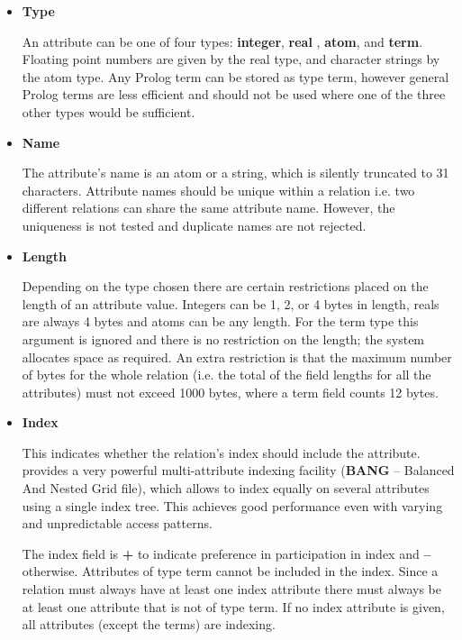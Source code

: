 \begin{itemize}

\item{{\bf Type}}

An attribute can be one of four types:
{\bf integer}, {\bf real} , {\bf atom}, and {\bf term}.  Floating point numbers
are given by the real type, and character strings by the atom type. Any Prolog
term can be stored as type term, however general Prolog terms are
less efficient and should not be used where one of the three other types
would be sufficient.

\item{{\bf Name}}
 
The attribute's name is an atom or a string, which is silently
truncated to 31 characters. Attribute names should be unique within
a relation i.e. two different relations can share the same
attribute name. However, the uniqueness is not tested and duplicate names
are not rejected.

\item{{\bf Length}}
 
Depending on the type chosen there are certain
restrictions placed on the length of an attribute value.
Integers can be 1, 2, or 4 bytes in length, reals are always 4 bytes and atoms
can be any length.  For the term type this argument is ignored and there
is no restriction on the length; the
system allocates space as required.  An extra restriction is that the maximum number
of bytes for the whole relation (i.e. the total of the field lengths
for all the attributes) must not exceed 1000 bytes, where a term field counts
12 bytes.

\item{{\bf Index}}

 
This indicates whether the relation's index should include the attribute.
\eclipse provides a very powerful multi-attribute indexing facility
({\bf BANG} -- Balanced And Nested Grid file), which
allows to index equally on several attributes using a single index
tree. This achieves good performance even with varying and unpredictable
access patterns.

The index field is {\bf +} to indicate preference in participation
in index and {\bf --} otherwise. Attributes of type term cannot be included
in the index. Since a relation must always have at least one index
attribute there must always be at least one attribute that is not
of type term.
If no index attribute is given, all attributes (except the
terms) are indexing.
 
\end{itemize}


